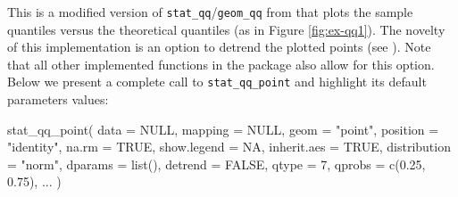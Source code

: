 This is a modified version of \texttt{stat\_qq}/\texttt{geom\_qq} from
 that plots the sample quantiles versus the theoretical
quantiles (as in Figure \ref{fig:ex-qq1}). The novelty of this
implementation is an option to detrend the plotted points (see
). Note that all other implemented functions in
the  package also allow for this option. Below we present a
complete call to \texttt{stat\_qq\_point} and highlight its default
parameters values:

\begin{Schunk}
\begin{Sinput}
stat_qq_point(
  data = NULL,
  mapping = NULL,
  geom = "point",
  position = "identity",
  na.rm = TRUE,
  show.legend = NA,
  inherit.aes = TRUE,
  distribution = "norm",
  dparams = list(),
  detrend = FALSE,
  qtype = 7,
  qprobs = c(0.25, 0.75),
  ...
  )
\end{Sinput}
\end{Schunk}

